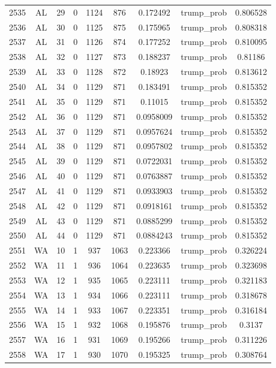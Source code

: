 \documentclass[12pt,a4paper]{article}
\begin{document}
\begin{tabular}{r|cccccccc}
	2535 & AL & 29 & 0 & 1124 & 876 & 0.172492 & trump\_prob & 0.806528 \\
	2536 & AL & 30 & 0 & 1125 & 875 & 0.175965 & trump\_prob & 0.808318 \\
	2537 & AL & 31 & 0 & 1126 & 874 & 0.177252 & trump\_prob & 0.810095 \\
	2538 & AL & 32 & 0 & 1127 & 873 & 0.188237 & trump\_prob & 0.81186 \\
	2539 & AL & 33 & 0 & 1128 & 872 & 0.18923 & trump\_prob & 0.813612 \\
	2540 & AL & 34 & 0 & 1129 & 871 & 0.183491 & trump\_prob & 0.815352 \\
	2541 & AL & 35 & 0 & 1129 & 871 & 0.11015 & trump\_prob & 0.815352 \\
	2542 & AL & 36 & 0 & 1129 & 871 & 0.0958009 & trump\_prob & 0.815352 \\
	2543 & AL & 37 & 0 & 1129 & 871 & 0.0957624 & trump\_prob & 0.815352 \\
	2544 & AL & 38 & 0 & 1129 & 871 & 0.0957802 & trump\_prob & 0.815352 \\
	2545 & AL & 39 & 0 & 1129 & 871 & 0.0722031 & trump\_prob & 0.815352 \\
	2546 & AL & 40 & 0 & 1129 & 871 & 0.0763887 & trump\_prob & 0.815352 \\
	2547 & AL & 41 & 0 & 1129 & 871 & 0.0933903 & trump\_prob & 0.815352 \\
	2548 & AL & 42 & 0 & 1129 & 871 & 0.0918161 & trump\_prob & 0.815352 \\
	2549 & AL & 43 & 0 & 1129 & 871 & 0.0885299 & trump\_prob & 0.815352 \\
	2550 & AL & 44 & 0 & 1129 & 871 & 0.0884243 & trump\_prob & 0.815352 \\
	2551 & WA & 10 & 1 & 937 & 1063 & 0.223366 & trump\_prob & 0.326224 \\
	2552 & WA & 11 & 1 & 936 & 1064 & 0.223635 & trump\_prob & 0.323698 \\
	2553 & WA & 12 & 1 & 935 & 1065 & 0.223111 & trump\_prob & 0.321183 \\
	2554 & WA & 13 & 1 & 934 & 1066 & 0.223111 & trump\_prob & 0.318678 \\
	2555 & WA & 14 & 1 & 933 & 1067 & 0.223351 & trump\_prob & 0.316184 \\
	2556 & WA & 15 & 1 & 932 & 1068 & 0.195876 & trump\_prob & 0.3137 \\
	2557 & WA & 16 & 1 & 931 & 1069 & 0.195266 & trump\_prob & 0.311226 \\
	2558 & WA & 17 & 1 & 930 & 1070 & 0.195325 & trump\_prob & 0.308764 \\

\end{tabular}
\end{document}
